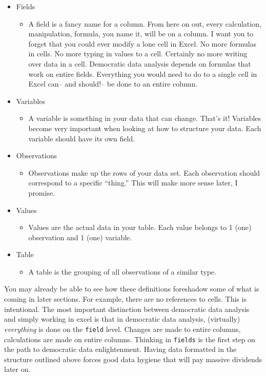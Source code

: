 \documentclass[]{book}
\providecommand{\tightlist}{%
  \setlength{\itemsep}{0pt}\setlength{\parskip}{0pt}}
\begin{document}
\begin{itemize}
\tightlist
\item
  Fields

  \begin{itemize}
  \tightlist
  \item
    A field is a fancy name for a column. From here on out, every calculation, manipulation, formula, you name it, will be on a column. I want you to forget that you could ever modify a lone cell in Excel. No more formulas in cells. No more typing in values to a cell. Certainly no more writing over data in a cell. Democratic data analysis depends on formulas that work on entire fields. Everything you would need to do to a single cell in Excel can-- and should!-- be done to an entire column.
  \end{itemize}
\item
  Variables

  \begin{itemize}
  \tightlist
  \item
    A variable is something in your data that can change. That's it! Variables become very important when looking at how to structure your data. Each variable should have its own field.
  \end{itemize}
\item
  Observations

  \begin{itemize}
  \tightlist
  \item
    Observations make up the rows of your data set. Each observation should correspond to a specific ``thing.'' This will make more sense later, I promise.
  \end{itemize}
\item
  Values

  \begin{itemize}
  \tightlist
  \item
    Values are the actual data in your table. Each value belongs to 1 (one) observation and 1 (one) variable.
  \end{itemize}
\item
  Table

  \begin{itemize}
  \tightlist
  \item
    A table is the grouping of all observations of a similar type.
  \end{itemize}
\end{itemize}

You may already be able to see how these definitions foreshadow some of what is coming in later sections. For example, there are no references to cells. This is intentional. The most important distinction between democratic data analysis and simply working in excel is that in democratic data analysis, (virtually) \emph{everything} is done on the \texttt{field} level. Changes are made to entire columns, calculations are made on entire columns. Thinking in \texttt{fields} is the first step on the path to democratic data enlightenment. Having data formatted in the structure outlined above forces good data hygiene that will pay massive dividends later on.
\end{document}
